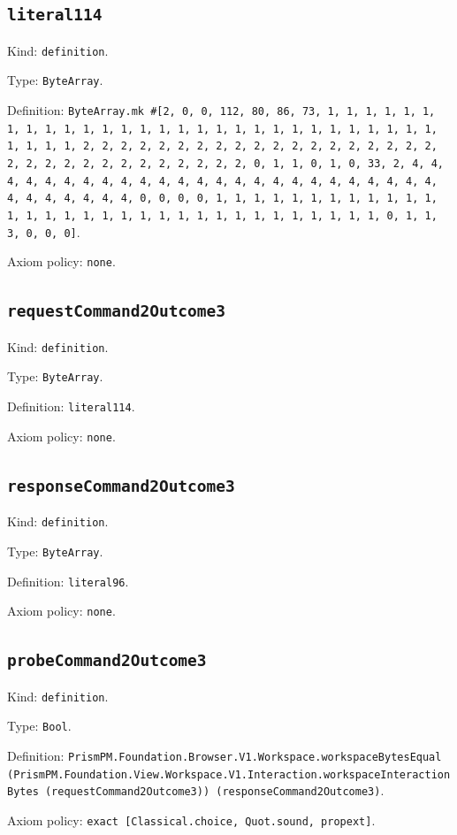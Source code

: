 \documentclass[11pt]{article}
\begin{document}
\subsection*{\texttt{literal114}}
\noindent Kind: \texttt{definition}.\par
\noindent Type: \texttt{ByteArray}.\par
\noindent Definition: \texttt{ByteArray.mk \#[2, 0, 0, 112, 80, 86, 73, 1, 1, 1, 1, 1, 1, 1, 1, 1, 1, 1, 1, 1, 1, 1, 1, 1, 1, 1, 1, 1, 1, 1, 1, 1, 1, 1, 1, 1, 1, 1, 1, 1, 2, 2, 2, 2, 2, 2, 2, 2, 2, 2, 2, 2, 2, 2, 2, 2, 2, 2, 2, 2, 2, 2, 2, 2, 2, 2, 2, 2, 2, 2, 2, 2, 0, 1, 1, 0, 1, 0, 33, 2, 4, 4, 4, 4, 4, 4, 4, 4, 4, 4, 4, 4, 4, 4, 4, 4, 4, 4, 4, 4, 4, 4, 4, 4, 4, 4, 4, 4, 4, 4, 4, 4, 0, 0, 0, 0, 1, 1, 1, 1, 1, 1, 1, 1, 1, 1, 1, 1, 1, 1, 1, 1, 1, 1, 1, 1, 1, 1, 1, 1, 1, 1, 1, 1, 1, 1, 1, 1, 0, 1, 1, 3, 0, 0, 0]}.\par
\noindent Axiom policy: \texttt{none}.\par
\subsection*{\texttt{requestCommand2Outcome3}}
\noindent Kind: \texttt{definition}.\par
\noindent Type: \texttt{ByteArray}.\par
\noindent Definition: \texttt{literal114}.\par
\noindent Axiom policy: \texttt{none}.\par
\subsection*{\texttt{responseCommand2Outcome3}}
\noindent Kind: \texttt{definition}.\par
\noindent Type: \texttt{ByteArray}.\par
\noindent Definition: \texttt{literal96}.\par
\noindent Axiom policy: \texttt{none}.\par
\subsection*{\texttt{probeCommand2Outcome3}}
\noindent Kind: \texttt{definition}.\par
\noindent Type: \texttt{Bool}.\par
\noindent Definition: \texttt{PrismPM.Foundation.Browser.V1.Workspace.workspaceBytesEqual (PrismPM.Foundation.View.Workspace.V1.Interaction.workspaceInteractionBytes (requestCommand2Outcome3)) (responseCommand2Outcome3)}.\par
\noindent Axiom policy: \texttt{exact [Classical.choice, Quot.sound, propext]}.\par
\end{document}
